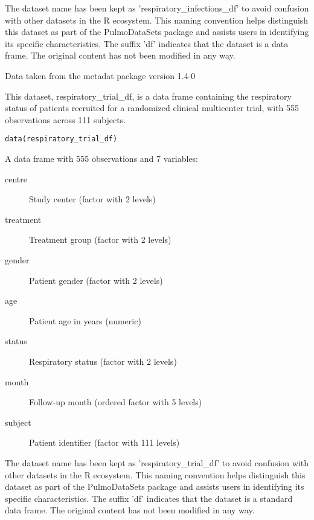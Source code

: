 \documentclass[a4paper]{book}
\begin{document}
%
\begin{Details}
The dataset name has been kept as 'respiratory\_infections\_df' to avoid confusion with other datasets
in the R ecosystem. This naming convention helps distinguish this dataset as part of the
PulmoDataSets package and assists users in identifying its specific characteristics.
The suffix 'df' indicates that the dataset is a data frame. The original content has not been modified
in any way.
\end{Details}
%
\begin{Source}
Data taken from the metadat package version 1.4-0
\end{Source}
%
\begin{Description}
This dataset, respiratory\_trial\_df, is a data frame containing the respiratory status
of patients recruited for a randomized clinical multicenter trial, with 555 observations
across 111 subjects.
\end{Description}
%
\begin{Usage}
\begin{verbatim}
data(respiratory_trial_df)
\end{verbatim}
\end{Usage}
%
\begin{Format}
A data frame with 555 observations and 7 variables:
\begin{description}

\item[centre] Study center (factor with 2 levels)
\item[treatment] Treatment group (factor with 2 levels)
\item[gender] Patient gender (factor with 2 levels)
\item[age] Patient age in years (numeric)
\item[status] Respiratory status (factor with 2 levels)
\item[month] Follow-up month (ordered factor with 5 levels)
\item[subject] Patient identifier (factor with 111 levels)

\end{description}

\end{Format}
%
\begin{Details}
The dataset name has been kept as 'respiratory\_trial\_df' to avoid confusion with other datasets
in the R ecosystem. This naming convention helps distinguish this dataset as part of the
PulmoDataSets package and assists users in identifying its specific characteristics.
The suffix 'df' indicates that the dataset is a standard data frame. The original content
has not been modified in any way.
\end{Details}
\end{document}
